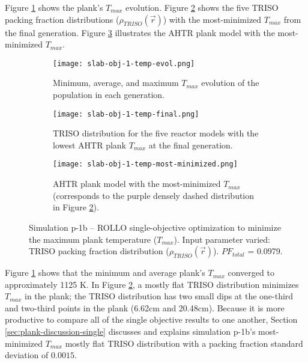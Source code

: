Figure \ref{fig:slab-obj-1-temp-evol} shows the plank's $T_{max}$ evolution. 
Figure \ref{fig:slab-obj-1-temp-final} shows the five \gls{TRISO} packing fraction
distributions ($\rho_{TRISO}(\vec{r})$) with the most-minimized $T_{max}$ from the 
final generation. 
Figure \ref{fig:slab-obj-1-temp-most-minimized} illustrates the \gls{AHTR} plank model 
with the most-minimized $T_{max}$. 
\begin{figure}[htbp!]
    \centering
    \begin{subfigure}{0.9\textwidth}
        \texttt{[image: slab-obj-1-temp-evol.png]}
        \caption{Minimum, average, and maximum $T_{max}$ evolution of the 
        population in each generation.}
        \label{fig:slab-obj-1-temp-evol} 
    \end{subfigure}
    \begin{subfigure}{0.9\textwidth}
        \texttt{[image: slab-obj-1-temp-final.png]}
        \caption{TRISO distribution for the five reactor models with the 
        lowest AHTR plank $T_{max}$ at the final generation.}
        \label{fig:slab-obj-1-temp-final} 
    \end{subfigure}
    \begin{subfigure}{0.9\textwidth}
        \texttt{[image: slab-obj-1-temp-most-minimized.png]}
        \caption{\gls{AHTR} plank model with the most-minimized $T_{max}$
        (corresponds to the purple densely dashed distribution in Figure 
        \ref{fig:slab-obj-1-temp-final}).}
        \label{fig:slab-obj-1-temp-most-minimized} 
    \end{subfigure}
    \caption{Simulation p-1b -- ROLLO single-objective optimization to minimize 
    the maximum plank temperature ($T_{max}$). Input parameter varied: TRISO 
    packing fraction distribution ($\rho_{TRISO}(\vec{r})$). $PF_{total}$ = 0.0979.}
    \label{fig:slab-obj-1-temp}
\end{figure}
Figure \ref{fig:slab-obj-1-temp-evol} shows that the minimum and average plank's 
$T_{max}$ converged to approximately 1125 K. 
In Figure \ref{fig:slab-obj-1-temp-final}, a mostly flat TRISO
distribution minimizes $T_{max}$ in the plank; the TRISO distribution 
has two small dips at the one-third and two-third points in the plank 
(6.62cm and 20.48cm). 
Because it is more productive to compare all of the single objective results to one 
another, Section \ref{sec:plank-discussion-single} discusses and explains simulation 
p-1b's most-minimized $T_{max}$ mostly flat TRISO distribution with a packing fraction 
standard deviation of $0.0015$. 

